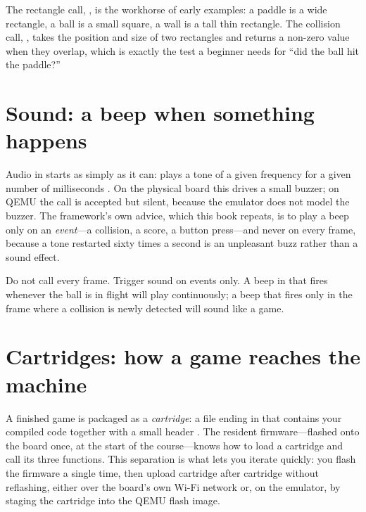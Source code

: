 The rectangle call, , is the workhorse of early examples:
a paddle is a wide rectangle, a ball is a small square, a wall is a tall thin
rectangle. The collision call, , takes the position
and size of two rectangles and returns a non-zero value when they overlap, which
is exactly the test a beginner needs for ``did the ball hit the paddle?''

\section{Sound: a beep when something happens}

Audio in \prg starts as simply as it can:  plays
a tone of a given frequency for a given number of milliseconds \citep{prg32abi}.
On the physical board this drives a small buzzer; on QEMU the call is accepted but
silent, because the emulator does not model the buzzer. The framework's own
advice, which this book repeats, is to play a beep only on an \emph{event}---a
collision, a score, a button press---and never on every frame, because a tone
restarted sixty times a second is an unpleasant buzz rather than a sound effect.

\begin{prgwarn}
Do not call  every frame. Trigger sound on events only.
A beep in  that fires whenever the ball is in flight will play
continuously; a beep that fires only in the frame where a collision is newly
detected will sound like a game.
\end{prgwarn}

\section{Cartridges: how a game reaches the machine}

A finished \prg game is packaged as a \emph{cartridge}: a file ending in
 that contains your compiled \riscv code together with a small
header \citep{prg32cartfmt}. The resident firmware---flashed onto the board once,
at the start of the course---knows how to load a cartridge and call its three
functions. This separation is what lets you iterate quickly: you flash the
firmware a single time, then upload cartridge after cartridge without reflashing,
either over the board's own Wi-Fi network or, on the emulator, by staging the
cartridge into the QEMU flash image.

